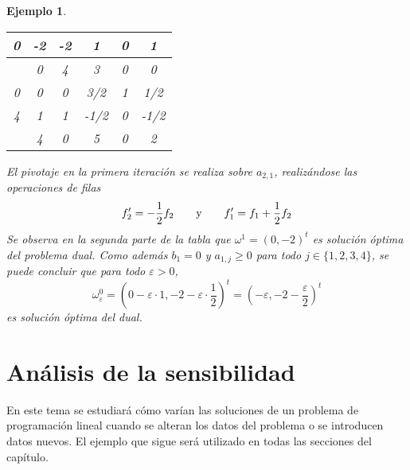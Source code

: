 \documentclass[11pt]{report}
\theoremstyle{mytheorem}
\theoremstyle{mydefinition}
\theoremstyle{myexample}
\newtheorem*{example}{Ejemplo}
\begin{document}
\begin{example}
\begin{center}
\begin{tabular}{|c|c|c|c|c|c|}
    0 & -2 & \multicolumn{1}{c}{-2} & \multicolumn{1}{c}{\phantom{-}1} & \multicolumn{1}{c}{\phantom{-}0} & \multicolumn{1}{c|}{\phantom{-}1} \\ \hline
    
    \multicolumn{1}{c|}{} & \phantom{-}0 & \multicolumn{1}{c}{\phantom{-}4} & \multicolumn{1}{c}{\phantom{-}3} & \multicolumn{1}{c}{\phantom{-}0} & \multicolumn{1}{c|}{\phantom{-}0} \\ \hhline{-|=|=|=|=|=|}

    0 & \phantom{-}0 & \multicolumn{1}{c}{\phantom{-}0} & \multicolumn{1}{c}{\phantom{-}3/2} & \multicolumn{1}{c}{\phantom{-}1} & \multicolumn{1}{c|}{\phantom{-}1/2} \\
    
    4 & \phantom{-}1 & \multicolumn{1}{c}{\phantom{-}1} & \multicolumn{1}{c}{-1/2} & \multicolumn{1}{c}{\phantom{-}0} & \multicolumn{1}{c|}{-1/2} \\ \hline
    
    \multicolumn{1}{c|}{} & \phantom{-}4 & \multicolumn{1}{c}{\phantom{-}0} & \multicolumn{1}{c}{\phantom{-}5} & \multicolumn{1}{c}{\phantom{-}0} & \multicolumn{1}{c|}{\phantom{-}2} \\
    
    \cline{2-6}
\end{tabular}
\end{center}
El pivotaje en la primera iteración se realiza sobre $a_{2,1}$, realizándose las operaciones de filas
\[f_2'=-\frac{1}{2}f_2 \qquad \textup{y} \qquad f_1'=f_1+\frac{1}{2}f_2\]
Se observa en la segunda parte de la tabla que $\omega^1 = (0,-2)^t$ es solución óptima del problema dual. Como además $b_1 = 0$ y $a_{1,j} \geq 0$ para todo $j \in \{1,2,3,4\}$, se puede concluir que para todo $\varepsilon >0$, 
\[\omega^0_\varepsilon = (0-\varepsilon \cdot 1,-2-\varepsilon \cdot \frac{1}{2})^t = (-\varepsilon,-2-\frac{\varepsilon}{2})^t\]
es solución óptima del dual.
\end{example}

\chapter{Análisis de la sensibilidad}

En este tema se estudiará cómo varían las soluciones de un problema de programación lineal cuando se alteran los datos del problema o se introducen datos nuevos. El ejemplo que sigue será utilizado en todas las secciones del capítulo.
\end{document}
